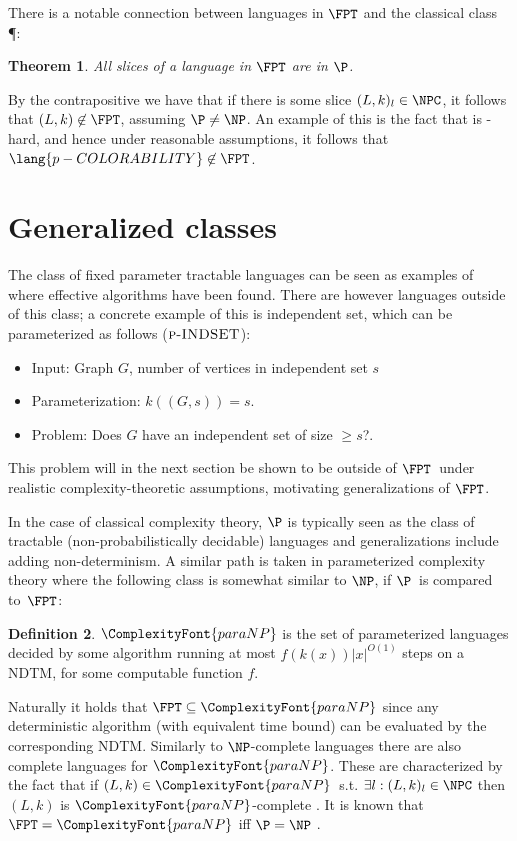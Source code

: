 \documentclass[a4paper,11pt]{report}
\theoremstyle{plain}
\newtheorem{thm}{Theorem}[chapter] %
\theoremstyle{definition}
\newtheorem{defn}[thm]{Definition} %
\newcommand{\PARANP}{\ComplexityFont{paraNP}}
\begin{document}
There is a notable connection between languages in $\FPT$ and the classical class \P \cite{FG06}:

\begin{thm}
All slices of a language in $\FPT$ are in $\P$.
\end{thm}

By the contrapositive we have that if there is some slice $(L, k)_{l} \in \NPC$, it follows that $(L, k) \not \in \FPT$, assuming $\P \not = \NP$.
An example of this is the fact that  is \NP-hard, and hence under reasonable assumptions, it follows that $\lang{p-COLORABILITY} \not \in \FPT$.

\section{Generalized classes}
The class of fixed parameter tractable languages can be seen as examples of where effective algorithms have been found.
There are however languages outside of this class; a concrete example of this is independent set, which can be parameterized as follows ($\textsc{p-INDSET}$):

\begin{itemize}
\item Input: Graph $G$, number of vertices in independent set $s$
\item Parameterization: $k((G, s)) = s$.
\item Problem: Does $G$ have an independent set of size $\ge s$?.
\end{itemize}

This problem will in the next section be shown to be outside of $\FPT$ under realistic complexity-theoretic assumptions, motivating generalizations of $\FPT$.

In the case of classical complexity theory, $\P$ is typically seen as the class of tractable (non-probabilistically decidable) languages and generalizations include adding non-determinism.
A similar path is taken in parameterized complexity theory where the following class is somewhat similar to $\NP$, if $\P$ is compared to $\FPT$:

\begin{defn}
$\PARANP$ is the set of parameterized languages decided by some algorithm running at most $f(k(x)) |x|^{O(1)}$ steps on a NDTM, for some computable function $f$.
\end{defn}

Naturally it holds that $\FPT \subseteq \PARANP$ since any deterministic algorithm (with equivalent time bound) can be evaluated by the corresponding NDTM.
Similarly to $\NP$-complete languages there are also complete languages for $\PARANP$.
These are characterized by the fact that if $(L, k) \in \PARANP$ s.t. $\exists l : (L, k)_l \in \NPC$ then $(L, k)$ is $\PARANP$-complete \cite{FG06}.
It is known that $\FPT = \PARANP$ iff $\P = \NP$ \cite{FG06}.
\end{document}
